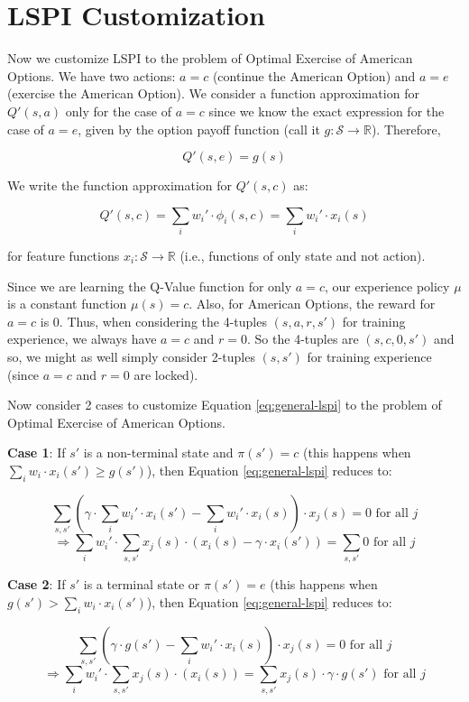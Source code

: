 \documentclass[12pt]{amsart}
\begin{document}
\section{LSPI Customization}

Now we customize LSPI to the problem of Optimal Exercise of American Options. We have two actions: $a=c$ (continue the American Option) and $a=e$ (exercise the American Option). We consider a function approximation for $Q'(s,a)$ only for the case of $a=c$ since we know the exact expression for the case of $a=e$, given by the option payoff function (call it $g: \mathcal{S} \rightarrow \mathbb{R}$). Therefore,

$$Q'(s,e) = g(s)$$

We write the function approximation for $Q'(s,c)$ as:

$$Q'(s,c) = \sum_i w_i' \cdot \phi_i(s, c) = \sum_i w_i' \cdot x_i(s)$$

for feature functions $x_i: \mathcal{S} \rightarrow \mathbb{R}$ (i.e., functions of only state and not action).

Since we are learning the Q-Value function for only $a=c$, our experience policy $\mu$ is a constant function $\mu(s) = c$. Also, for American Options, the reward for $a=c$ is 0. Thus, when considering the 4-tuples $(s,a,r,s')$ for training experience, we always have $a=c$ and $r=0$. So the 4-tuples are $(s,c,0,s')$ and so, we might as well simply consider 2-tuples $(s,s')$ for training experience (since $a=c$ and $r=0$ are locked).

Now consider 2 cases to customize Equation \eqref{eq:general-lspi} to the problem of Optimal Exercise of American Options.

{\bf Case 1}: If $s'$ is a non-terminal state and $\pi(s') = c$ (this happens when $\sum_i w_i \cdot x_i(s') \geq g(s')$), then Equation \eqref{eq:general-lspi} reduces to:

$$\sum_{s,s'} (\gamma \cdot \sum_i w_i' \cdot x_i(s') - \sum_i w_i' \cdot x_i(s)) \cdot x_j(s) = 0 \text{ for all } j$$
\begin{equation}
\Rightarrow \sum_i w_i' \cdot \sum_{s,s'} x_j(s) \cdot (x_i(s) - \gamma \cdot x_i(s')) = \sum_{s,s'} 0 \text{ for all } j
\label{eq:lspi-amopt1}
\end{equation}

{\bf Case 2}: If $s'$ is a terminal state or $\pi(s') = e$ (this happens when $g(s') > \sum_i w_i \cdot x_i(s')$), then Equation \eqref{eq:general-lspi} reduces to:

$$\sum_{s,s'} (\gamma \cdot g(s') - \sum_i w_i' \cdot x_i(s)) \cdot x_j(s) = 0 \text{ for all } j$$
\begin{equation}
\Rightarrow \sum_i w_i' \cdot \sum_{s,s'} x_j(s) \cdot (x_i(s)) = \sum_{s,s'} x_j(s) \cdot \gamma \cdot g(s') \text{ for all } j
\label{eq:lspi-amopt2}
\end{equation}
\end{document}
